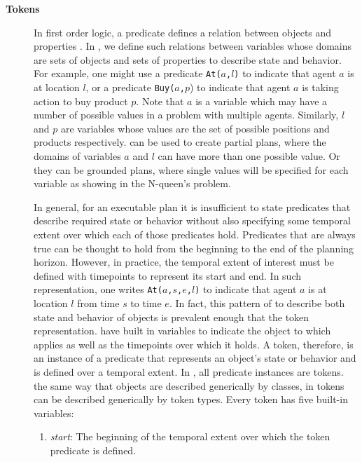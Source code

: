 \begin{description}
\item[\textbf{Tokens}] In first order logic, a predicate defines a
  relation between objects and properties \cite{gen87}.  In \eu, we
  define such relations between variables whose domains are sets of
  objects and sets of properties to describe state and behavior. For
  example, one might use a predicate \texttt{At($a$,$l$)} to indicate
  that agent $a$ is at location $l$, or a predicate
  \texttt{Buy($a$,$p$}) to indicate that agent $a$ is taking action to
  buy product $p$. Note that $a$ is a variable which may have a number
  of possible values in a problem with multiple agents. Similarly, $l$
  and $p$ are variables whose values are the set of possible positions
  and products respectively. \eu can be used to create partial plans,
  where the domains of variables $a$ and $l$ can have more than one
  possible value. Or they can be grounded plans, where single values
  will be specified for each variable as showing in the N-queen's
  problem.

  In general, for an executable plan it is insufficient to state
  predicates that describe required state or behavior without also
  specifying some temporal extent over which each of those predicates
  hold. Predicates that are always true can be thought to hold from
  the beginning to the end of the planning horizon. However, in
  practice, the temporal extent of interest must be defined with
  timepoints \cite{Dean88} to represent its start and end.  In such
   representation, one writes \texttt{At($a$,$s$,$e$,$l$)}
  to indicate that agent $a$ is at location $l$ from time $s$ to time
  $e$. In fact, this pattern of  to describe both
  state and behavior of objects is prevalent enough that \eu
   the token
  representation.  have built in variables to
  indicate the object to which  applies as well
  as the timepoints over which it holds. A token, therefore, is an
  instance of a predicate that represents an object's state or
  behavior and is defined over a temporal extent. In \eu, all
  predicate instances are tokens.  the same way that
  objects are described generically by classes, in \eu tokens can be
  described generically by token types. Every token has five built-in
  variables:

  \begin{enumerate}

  \item \textit {start}: The beginning of the temporal extent over
    which the token predicate is defined.


\end{enumerate}
\end{description}
